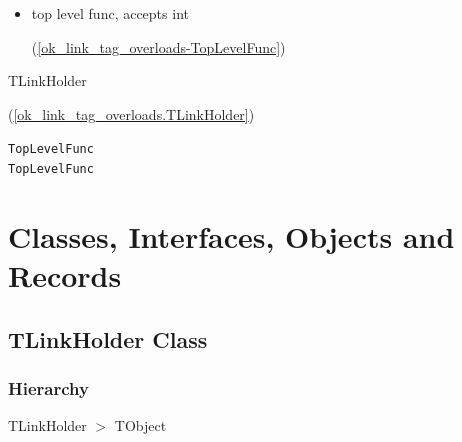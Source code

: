 \documentclass{report}
\newif\ifpdf
\begin{document}
\begin{description}
\begin{itemize}
\item \begin{ttfamily}top level func, accepts int\end{ttfamily}(\ref{ok_link_tag_overloads-TopLevelFunc})
\end{itemize}
\item[\texttt{\begin{ttfamily}TOverloadedBase\end{ttfamily} Class}]
\item[\texttt{\begin{ttfamily}TOverloadedMethods\end{ttfamily} Class}]\begin{ttfamily}TLinkHolder\end{ttfamily}(\ref{ok_link_tag_overloads.TLinkHolder})
\end{description}
\begin{description}
\item[\texttt{TopLevelFunc}]
\item[\texttt{TopLevelFunc}]
\end{description}
\section{Classes, Interfaces, Objects and Records}
\ifpdf
\subsection*{\large{\textbf{TLinkHolder Class}}\normalsize\hspace{1ex}\hrulefill}
\else
\subsection*{TLinkHolder Class}
\fi
\label{ok_link_tag_overloads.TLinkHolder}
\subsubsection*{\large{\textbf{Hierarchy}}\normalsize\hspace{1ex}\hfill}
TLinkHolder {$>$} TObject
\end{document}
